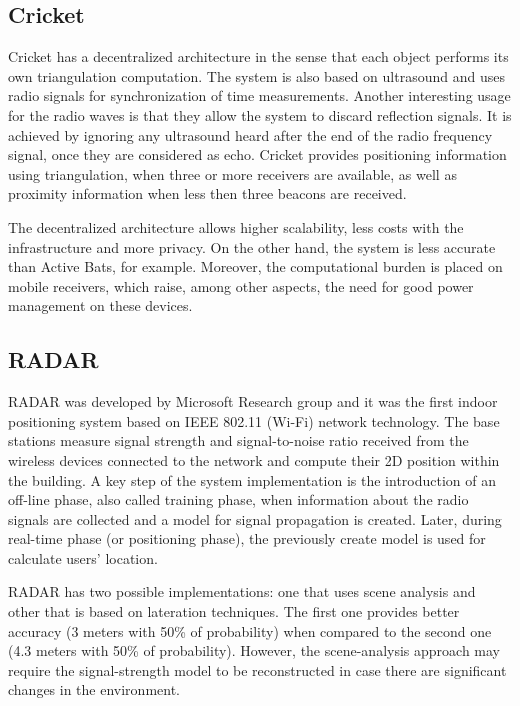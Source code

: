 \subsection{Cricket}
Cricket \cite{cricket} has a decentralized architecture in the sense that each object performs its own triangulation computation. The system is also based on ultrasound and uses radio signals for synchronization of time measurements. Another interesting usage for the radio waves is that they allow the system to discard reflection signals. It is achieved by ignoring any ultrasound heard after the end of the radio frequency signal, once they are considered as echo. Cricket provides positioning information using triangulation, when three or more receivers are available, as well as proximity information when less then three beacons are received.

The decentralized architecture allows higher scalability, less costs with the infrastructure and more privacy. On the other hand, the system is less accurate than Active Bats, for example. Moreover, the computational burden is placed on mobile receivers, which raise, among other aspects, the need for good power management on these devices.

\subsection{RADAR}
RADAR \cite{RADAR} was developed by Microsoft Research group and it was the first indoor positioning system based on IEEE 802.11 (Wi-Fi) network technology. The base stations measure signal strength and signal-to-noise ratio received from the wireless devices connected to the network and compute their 2D position within the building. A key step of the system implementation is the introduction of an off-line phase, also called training phase, when information about the radio signals are collected and a model for signal propagation is created. Later, during real-time phase (or positioning phase), the previously create model is used for calculate users' location.

RADAR has two possible implementations: one that uses scene analysis and other that is based on lateration techniques. The first one provides better accuracy (3 meters with 50\% of probability) when compared to the second one (4.3 meters with 50\% of probability). However, the scene-analysis approach may require the signal-strength model to be reconstructed in case there are significant changes in the environment.

